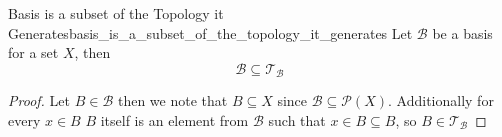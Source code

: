 \begin{corollary}
{Basis is a subset of the Topology it Generates}{basis_is_a_subset_of_the_topology_it_generates}
Let \(\mathcal{B} \) be a basis for a set \(X \), then
\[
\mathcal{B} \subseteq \mathcal{T} _{\mathcal{B}}
\]
\end{corollary}
\begin{proof}
   Let \(B \in \mathcal{B} \) then we note that \(B \subseteq X \) since
   \(\mathcal{B} \subseteq \mathcal{P} \left(X\right) \). Additionally
   for every \(x \in B \) \(B \) itself is an element from \(\mathcal{B}
   \) such that \(x \in B \subseteq B \), so \(B \in \mathcal{T} _{
   \mathcal{B}} \)
\end{proof}

